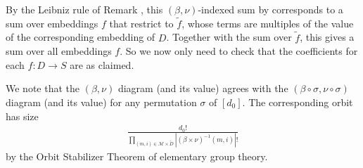 \documentclass{article}
\theoremstyle{plain}
\theoremstyle{definition}
\newcommand{\wabs}[1]{\left|#1\right|}
\newcommand{\Mm}{\mathcal{M}}
\begin{document}
            By the Leibniz rule of Remark \label{rmk:leibniz}, this $(\beta,
            \nu)$-indexed sum by corresponds to a sum over embeddings $f$ that
            restrict to $\tilde f$, whose terms are multiples of the value of
            the corresponding embedding of $D$.  Together with the sum over
            $\tilde f$, this gives a sum over all embeddings $f$.  So we now
            only need to check that the coefficients for each $f:D\to S$ are as
            claimed.

            We note that the $(\beta, \nu)$ diagram (and its value) agrees with
            the $(\beta \circ \sigma, \nu \circ \sigma)$ diagram (and its
            value) for any permutation $\sigma$ of $[d_0]$.  The corresponding
            orbit has size
            \begin{align*}
                \frac{d_0!}{
                    \prod_{(m, i) \in \Mm \times \tilde D}
                        \wabs{(\beta \times \nu)^{-1}(m, i)}!
                }
            \end{align*}
            by the Orbit Stabilizer Theorem of elementary group theory.   
\end{document}
